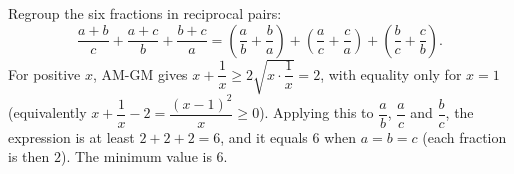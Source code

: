 Regroup the six fractions in reciprocal pairs:
\[\dfrac{a+b}{c}+\dfrac{a+c}{b}+\dfrac{b+c}{a}=\left(\dfrac {a}{b}+\dfrac {b}{a}\right)+\left(\dfrac {a}{c}+\dfrac {c}{a}\right)+\left(\dfrac {b}{c}+\dfrac {c}{b}\right).\]
For positive $x$, AM-GM gives $x+\dfrac{1}{x}\ge2\sqrt{x\cdot\dfrac{1}{x}}=2$, with equality only for $x=1$ (equivalently $x+\dfrac{1}{x}-2=\dfrac{(x-1)^2}{x}\ge0$). Applying this to $\dfrac {a}{b}$, $\dfrac {a}{c}$ and $\dfrac {b}{c}$, the expression is at least $2+2+2=6$, and it equals $6$ when $a=b=c$ (each fraction is then $2$). The minimum value is $\boxed{6}$.
